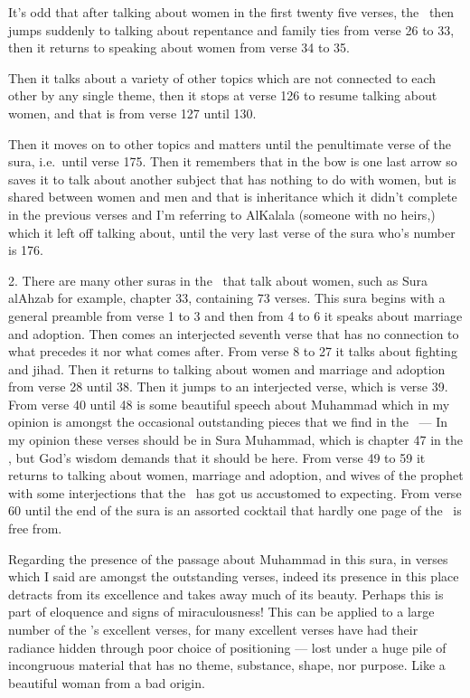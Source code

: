 \documentclass[12pt]{memoir}
\begin{document}
It’s odd that after talking about women in the first twenty five verses,
the \Quran\ then jumps suddenly to talking about repentance
and family ties from verse 26 to 33,
then it returns to speaking about women from verse 34 to 35.

Then it talks about a variety of other topics
which are not connected to each other by any single theme,
then it stops at verse 126 to resume talking about women,
and that is from verse 127 until 130.

Then it moves on to other topics and matters until the penultimate verse
of the sura, i.e.\ until verse 175.
Then it remembers that in the bow is one last arrow
so saves it to talk about another subject that has nothing to do with women,
but is shared between women and men and that is inheritance
which it didn’t complete in the previous verses
and I’m referring to Al\–Kalala (someone with no heirs,)
which it left off talking about,
until the very last verse of the sura who’s number is 176.

2. There are many other suras in the \Quran\ that talk about women,
such as Sura al\–Ahzab for example, chapter 33, containing 73 verses.
This sura begins with a general preamble from verse 1 to 3
and then from 4 to 6 it speaks about marriage and adoption.
Then comes an interjected seventh verse that has no connection
to what precedes it nor what comes after.
From verse 8 to 27 it talks about fighting and jihad.
Then it returns to talking about women and marriage
and adoption from verse 28 until 38.
Then it jumps to an interjected verse, which is verse 39.
From verse 40 until 48 is some beautiful speech about Muhammad
which in my opinion is amongst the occasional outstanding pieces
that we find in the \Quran\ —
In my opinion these verses should be in Sura Muhammad,
which is chapter 47 in the \Quran, but God’s wisdom demands
that it should be here.
From verse 49 to 59 it returns to talking about women,
marriage and adoption, and wives of the prophet with some interjections
that the \Quran\ has got us accustomed to expecting.
From verse 60 until the end of the sura is an assorted cocktail
that hardly one page of the \Quran\ is free from.

Regarding the presence of the passage about Muhammad in this sura,
in verses which I said are amongst the outstanding verses,
indeed its presence in this place detracts from its excellence
and takes away much of its beauty.
Perhaps this is part of eloquence and signs of miraculousness!
This can be applied to a large number of the \Quran’s excellent verses,
for many excellent verses have had their radiance hidden
through poor choice of positioning —
lost under a huge pile of incongruous material
that has no theme, substance, shape, nor purpose.
Like a beautiful woman from a bad origin.\fnmarksym[*]
\end{document}
